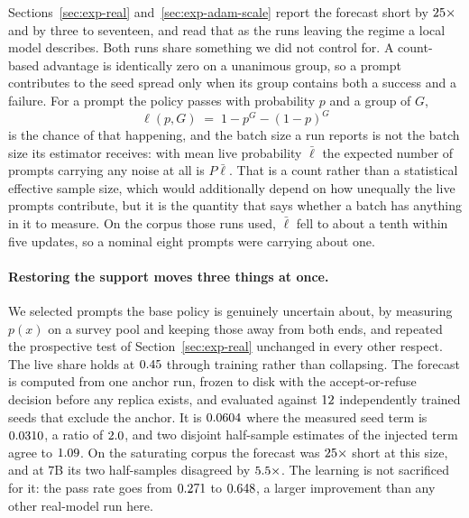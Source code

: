 Sections~\ref{sec:exp-real} and~\ref{sec:exp-adam-scale} report the forecast short by
$25\times$ and by three to seventeen, and read that as the runs leaving the regime a local model
describes. Both runs share something we did not control for. A count-based advantage is
identically zero on a unanimous group, so a prompt contributes to the seed spread only when its
group contains both a success and a failure. For a prompt the policy passes with probability $p$
and a group of $G$,
\begin{equation}
  \label{eq:live}
  \ell(p, G) \;=\; 1 - p^{G} - (1-p)^{G}
\end{equation}
is the chance of that happening, and the batch size a run reports is not the batch size its
estimator receives: with mean live probability $\bar\ell$ the expected number of prompts carrying
any noise at all is $P\bar\ell$. That is a count rather than a statistical effective sample size,
which would additionally depend on how unequally the live prompts contribute, but it is the
quantity that says whether a batch has anything in it to measure. On the corpus those runs used, $\bar\ell$ fell to about a
tenth within five updates, so a nominal eight prompts were carrying about one.

\paragraph{Restoring the support moves three things at once.} We selected prompts the base policy
is genuinely uncertain about, by measuring $p(x)$ on a survey pool and keeping those away from
both ends, and repeated the prospective test of Section~\ref{sec:exp-real} unchanged in every
other respect. The live share holds at $0.45$ through training rather than collapsing.
The forecast is computed from one anchor run, frozen to disk with the accept-or-refuse decision
before any replica exists, and evaluated against $12$ independently trained seeds that
exclude the anchor. It is $0.0604$ where the measured seed term is
$0.0310$, a ratio of $2.0$, and two disjoint half-sample estimates of the
injected term agree to $1.09$. On the saturating corpus the forecast was
$25\times$ short at this size, and at $7$B its two half-samples disagreed by
$5.5\times$. The learning is not sacrificed for it: the pass rate goes from
$0.271$ to $0.648$, a larger improvement than any other real-model run here.


